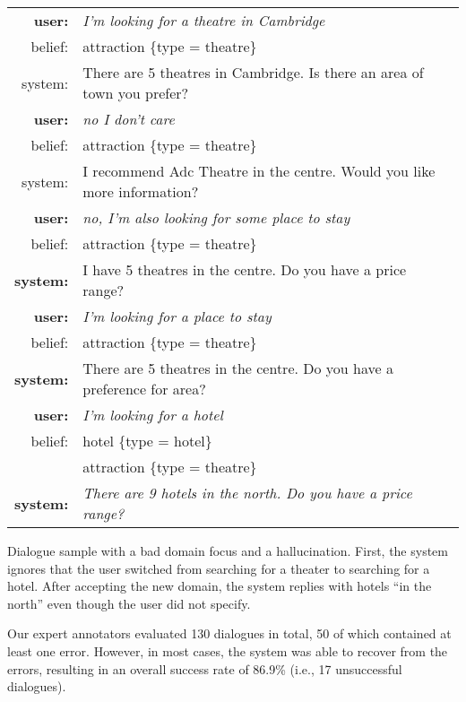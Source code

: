 \documentclass[11pt,a4paper]{article}
\begin{document}
\begin{example}[tpbh]
\small
\setlength{\tabcolsep}{2pt}
\begin{mdframed}[style=ExampleFrame]
\begin{tabularx}{\textwidth}{rX}
\bf user: & \it I'm looking for a theatre in Cambridge \\
belief: & attraction \{type = theatre\} \\
system: & There are 5 theatres in Cambridge. Is there an area of town you prefer? \\
\bf user: & \it no I don't care \\
belief: & attraction \{type = theatre\} \\
system: & I recommend Adc Theatre in the centre. Would you like more information? \\
\bf user: & \it no, I'm also looking for some place to stay \\
belief: & attraction \{type = theatre\} \\
\bf system: & I have 5 theatres in the centre. Do you have a price range? \\
\bf user: &  \it I'm looking for a place to stay \\
belief: & attraction \{type = theatre\} \\
\bf system: & There are 5 theatres in the centre. Do you have a preference for area? \\
\bf user: & \it I'm looking for a hotel \\
belief: & hotel \{type = hotel\} \\ 
& attraction \{type = theatre\} \\
\bf system: & \it There are 9 hotels in the north. Do you have a price range?\\
\end{tabularx}
\end{mdframed}
\caption{Dialogue sample with a bad domain focus and a hallucination. First, the system ignores that the user switched from searching for a theater to searching for a hotel. After accepting the new domain, the system replies with hotels “in the north” even though the user did not specify.\label{ex:error2}}
\end{example}



Our expert annotators evaluated 130 dialogues in total, 50 of which contained at least one error.
However, in most cases, the system was able to recover from the errors, resulting in an overall success rate of 86.9\% (i.e., 17 unsuccessful dialogues).
\end{document}
